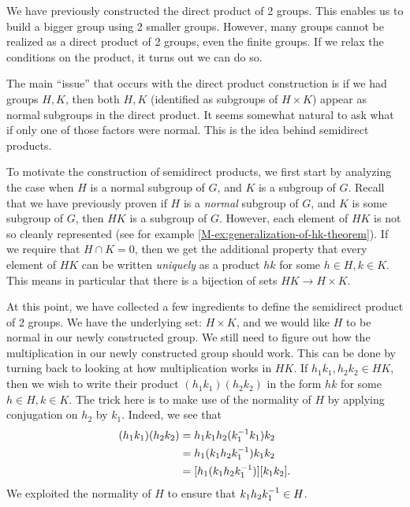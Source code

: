 \documentclass[./main.tex]{subfiles}
\begin{document}
We have previously constructed the direct product of 2 groups. This enables us
to build a bigger group using 2 smaller groups. However, many groups cannot be
realized as a direct product of 2 groups, even the finite groups. If we
relax the conditions on the product, it turns out we can do so. 

The main ``issue'' that occurs with the direct product construction is if we had
groups $H, K$, then both $H, K$ (identified as subgroups of $H \times K$) appear
as normal subgroups in the direct product. It seems somewhat natural to ask what
if only one of those factors were normal. This is the idea behind semidirect products.

To motivate the construction of semidirect products, we first start by analyzing
the case when $H$ is a normal subgroup of $G$, and $K$ is a subgroup of $G$.
Recall that we have previously proven if $H$ is a \emph{normal} subgroup of $G$,
and $K$ is some subgroup of $G$, then $HK$ is a subgroup of $G$. However, each
element of $HK$ is not so cleanly represented (see for example
\cref{M-ex:generalization-of-hk-theorem}). If we require that $H \cap K = 0$,
then we get the additional property that every element of $HK$ can be written
\emph{uniquely} as a product $hk$ for some $h \in H, k \in K$. This means in
particular that there is a bijection of sets $HK \to H \times K$.

At this point, we have collected a few ingredients to define the semidirect
product of 2 groups. We have the underlying set: $H \times K$, and we would like
$H$ to be normal in our newly constructed group. We still need to figure out how
the multiplication in our newly constructed group should work. This can be done
by turning back to looking at how multiplication works in $HK$. If $h_1 k_1, h_2
k_2 \in HK$, then we wish to write their product $(h_1 k_1)(h_2 k_2)$ in the
form $hk$ for some $h \in H, k \in K$. The trick here is to make use of the
normality of $H$ by applying conjugation on $h_2$ by $k_1$. Indeed, we see that 
\begin{align*}
    (h_1 k_1) (h_2 k_2) &= h_1 k_1 h_2 (k_1^{-1} k_1) k_2 \\ 
    &= h_1 (k_1 h_2 k_1 ^{-1}) k_1 k_2 \\
    &= [h_1 (k_1 h_2 k_1^{-1})] [k_1 k_2].
\end{align*}
We exploited the normality of $H$ to ensure that $k_1 h_2 k_1 ^{-1} \in H$. 
\end{document}
